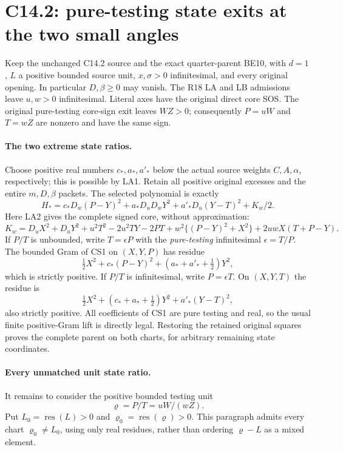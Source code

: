 \section{C14.2: pure-testing state exits at the two small angles}

Keep the unchanged C14.2 source and the exact quarter-parent BE10,
with $d=1$, $L$ a positive bounded source unit, $x,\sigma>0$
infinitesimal, and every original opening.  In particular $D,\beta\ge0$
may vanish.  The R18 LA and LB admissions leave $u,w>0$
infinitesimal.  Literal axes have the original direct core SOS.
The original pure-testing core-sign exit leaves $WZ>0$; consequently
$P=uW$ and $T=wZ$ are nonzero and have the same sign.

\paragraph{The two extreme state ratios.}
Choose positive real numbers $c_*,a_*,a'_* $ below the actual
source weights $C,A,\alpha$, respectively; this is possible by LA1.
Retain all positive original excesses and the entire $m,D,\beta$
packets.  The selected polynomial is exactly
\[
 H_*=c_*D_w(P-Y)^2+a_*D_uD_wY^2
       +a'_*D_u(Y-T)^2+K_w/2.                     \tag{CS1}
\]
Here LA2 gives the complete signed core, without approximation:
\[
 K_w=D_uX^2+D_uY^2+u^2T^2-2u^2TY-2PT
       +w^2\{(P-Y)^2+X^2\}+2uwX(T+P-Y).          \tag{CS2}
\]
If $P/T$ is unbounded, write $T=\epsilon P$ with the
\emph{pure-testing} infinitesimal $\epsilon=T/P$.  The bounded
Gram of CS1 on $(X,Y,P)$ has residue
\[
 \tfrac12X^2+c_*(P-Y)^2+(a_*+a'_*+\tfrac12)Y^2,
                                                               \tag{CS3}
\]
which is strictly positive.  If $P/T$ is infinitesimal, write
$P=\epsilon T$.  On $(X,Y,T)$ the residue is
\[
 \tfrac12X^2+(c_*+a_*+\tfrac12)Y^2+a'_*(Y-T)^2,  \tag{CS4}
\]
also strictly positive.  All coefficients of CS1 are pure testing
and real, so the usual finite positive-Gram lift is directly legal.
Restoring the retained original squares proves the complete parent
on both charts, for arbitrary remaining state coordinates.

\paragraph{Every unmatched unit state ratio.}
It remains to consider the positive bounded testing unit
\[
 \varrho=P/T=uW/(wZ).
\]
Put $L_0=\operatorname{res}(L)>0$ and
$\varrho_0=\operatorname{res}(\varrho)>0$.  This paragraph admits
every chart $\varrho_0\ne L_0$, using only real residues, rather
than ordering $\varrho-L$ as a mixed element.

